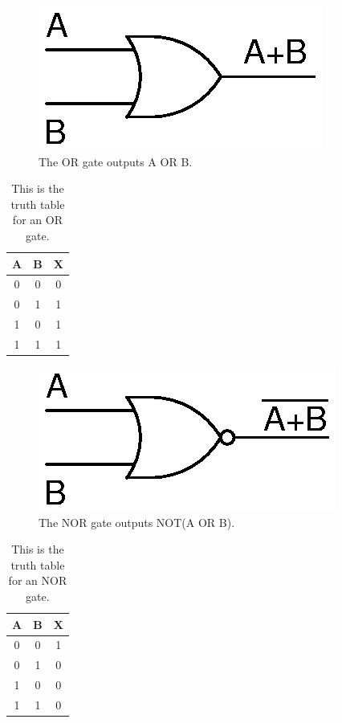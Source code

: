 \begin{figure}[!htb]
	\centering
	\includegraphics[scale=0.7]{logic/OR.eps}
	\caption{The OR gate outputs A OR B.}
	\label{fig:orgate}
\end{figure} 

\begin{table}[!ht]
	\centering
	\begin{tabular}{| c | c | c |}
		\hline
		A & B & X \\ 
		\hline
		0 & 0 & 0 \\ \hline
		0 & 1 & 1 \\ \hline
		1 & 0 & 1 \\ \hline
		1 & 1 & 1 \\ \hline
	\end{tabular}
	\caption{This is the truth table for an OR gate.}
	\label{table:orgate}
\end{table}

\begin{figure}[!htb]
	\centering
	\includegraphics[scale=0.7]{logic/NOR.eps}
	\caption{The NOR gate outputs NOT(A OR B).}
	\label{fig:norgate}
\end{figure} 

\begin{table}[!ht]
	\centering
	\begin{tabular}{| c | c | c |}
		\hline
		A & B & X \\ 
		\hline
		0 & 0 & 1 \\ \hline
		0 & 1 & 0 \\ \hline
		1 & 0 & 0 \\ \hline
		1 & 1 & 0 \\ \hline
	\end{tabular}
	\caption{This is the truth table for an NOR gate.}
	\label{table:norgate}
\end{table}

